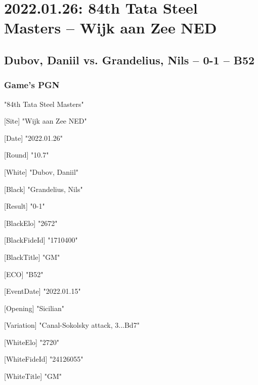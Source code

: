 \documentclass[9pt]{extarticle}
\begin{document}
\setlength{\columnsep}{32pt}
\section*{2022.01.26: 84th Tata Steel Masters -- Wijk aan Zee NED}

\subsection*{Dubov, Daniil vs. Grandelius, Nils -- 0-1 -- B52}
\subsubsection*{Game's PGN}
\begin{multicols}{2}
\begin{flushleft}
[Event] "84th Tata Steel Masters"

[Site] "Wijk aan Zee NED"

[Date] "2022.01.26"

[Round] "10.7"

[White] "Dubov, Daniil"

[Black] "Grandelius, Nils"

[Result] "0-1"

[BlackElo] "2672"

[BlackFideId] "1710400"

[BlackTitle] "GM"

[ECO] "B52"

[EventDate] "2022.01.15"

[Opening] "Sicilian"

[Variation] "Canal-Sokolsky attack, 3...Bd7"

[WhiteElo] "2720"

[WhiteFideId] "24126055"

[WhiteTitle] "GM"


\end{flushleft}
\end{multicols}
\end{document}
